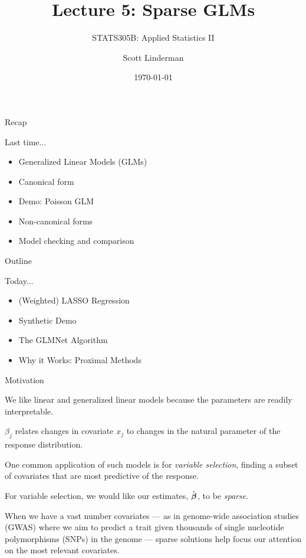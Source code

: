 \documentclass[aspectratio=169]{beamer}
\title{Lecture 5: Sparse GLMs}
\subtitle{STATS305B: Applied  Statistics II}
\author{Scott Linderman}
\date{\today}
\begin{document}
\maketitle
    
\begin{frame}{Recap}

Last time...
\begin{itemize}
    \item Generalized Linear Models (GLMs)
    \item Canonical form
    \item Demo: Poisson GLM
    \item Non-canonical forms
    \item Model checking and comparison
\end{itemize}
    
\end{frame}
    
\begin{frame}{Outline}

    Today...
    \begin{itemize}
        \item (Weighted) LASSO Regression
        \item Synthetic Demo
        \item The GLMNet Algorithm
        \item Why it Works: Proximal Methods
    \end{itemize}
    
\end{frame}

    
\begin{frame}[t,allowframebreaks]{Motivation}\label{sparse-glms}

We like linear and generalized linear models because the parameters are readily interpretable. 

\(\beta_j\) relates changes in covariate \(x_j\) to changes in the natural parameter of the
response distribution. 

One common application of such models is for \emph{variable selection}, finding a subset of covariates that are most
predictive of the response. 

For variable selection, we would like our estimates, \(\hat{\boldsymbol{\beta}}\), to be \emph{sparse}. 

When we have a vast number covariates --- as in genome-wide association studies (GWAS) where we aim
to predict a trait given thousands of single nucleotide polymorphisms
(SNPs) in the genome --- sparse solutions help focus our attention on
the most relevant covariates.

\end{frame}
\end{document}
